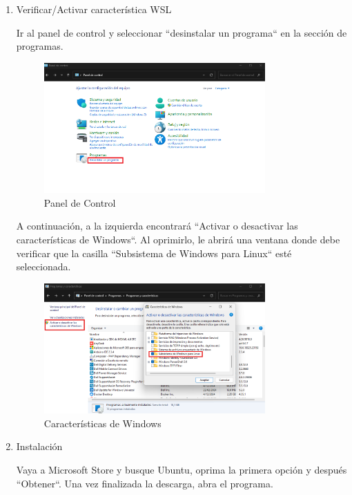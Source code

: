 \documentclass{article}
\begin{document}
\begin{enumerate}
    \item Verificar/Activar característica WSL

    Ir al panel de control y seleccionar ``desinstalar un programa`` en la sección de programas.

    \begin{figure}[H]
    \centering
    \includegraphics[width=0.8\textwidth]{images/manualUsuarioErlangBC_6.png}
    \caption{Panel de Control}
    \label{fig:panel_mm1}
    \end{figure}

    A continuación, a la izquierda encontrará ``Activar o desactivar las características de Windows``. Al oprimirlo, le abrirá una ventana donde debe verificar que la casilla ``Subsistema de Windows para Linux`` esté seleccionada.

    \begin{figure}[H]
    \centering
    \includegraphics[width=0.8\textwidth]{images/manualUsuarioErlangBC_7.png}
    \caption{Características de Windows}
    \label{fig:caracteristicas_mm1}
    \end{figure}

    \item Instalación

    Vaya a Microsoft Store y busque Ubuntu, oprima la primera opción y después ``Obtener``. Una vez finalizada la descarga, abra el programa.


\end{enumerate}
\end{document}
